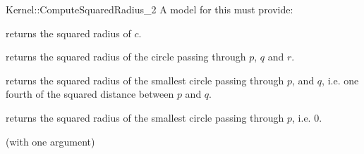 \begin{ccRefFunctionObjectConcept}{Kernel::ComputeSquaredRadius_2}
A model for this must provide:


       {returns the squared radius of $c$. }

       {returns the squared radius of the circle passing through $p$, $q$
       and $r$. }

{returns the squared radius of the smallest circle passing through $p$,
and $q$, i.e. one fourth of the squared distance between $p$ and $q$.}

{returns the squared radius of the smallest circle passing through $p$, i.e. $0$.}

\ccRefines
{} (with one argument)

\ccSeeAlso
{} \\
  \\

\end{ccRefFunctionObjectConcept}

